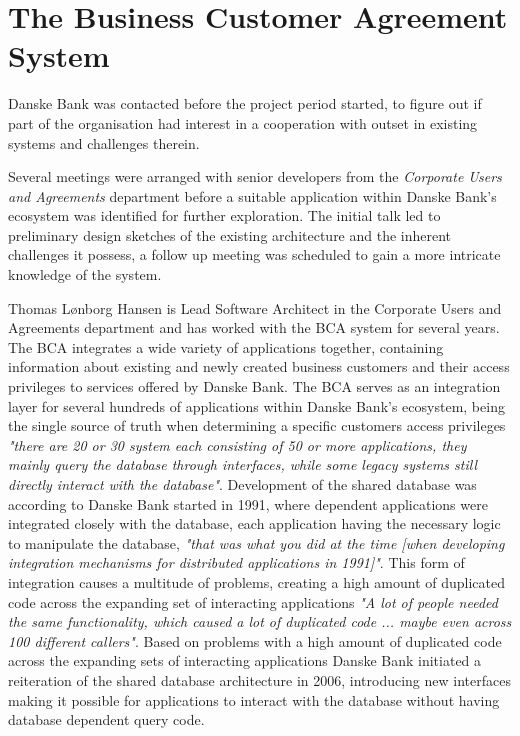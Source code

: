 \section{The Business Customer Agreement System}
Danske Bank was contacted before the project period started, to figure out if part of the organisation had interest in a cooperation with outset in existing systems and challenges therein. 

Several meetings were arranged with senior developers from the \textit{Corporate Users and Agreements} department before a suitable application within Danske Bank's ecosystem was identified for further exploration. The initial talk led to preliminary design sketches of the existing architecture and the inherent challenges it possess, a follow up meeting was scheduled to gain a more intricate knowledge of the system.

Thomas Lønborg Hansen is Lead Software Architect in the Corporate Users and Agreements department and has worked with the BCA system for several years. The BCA integrates a wide variety of applications together, containing information about existing and newly created business customers and their access privileges to services offered by Danske Bank. The BCA serves as an integration layer for several hundreds of applications within Danske Bank's ecosystem, being the single source of truth when determining a specific customers access privileges \textit{"there are 20 or 30 system each consisting of 50 or more applications, they mainly query the database through interfaces, while some legacy systems still directly interact with the database"}. Development of the shared database was according to Danske Bank started in 1991, where dependent applications were integrated closely with the database, each application having the necessary logic to manipulate the database, \textit{"that was what you did at the time [when developing integration mechanisms for distributed applications in 1991]"}. This form of integration causes a multitude of problems, creating a high amount of duplicated code across the expanding set of interacting applications \textit{"A lot of people needed the same functionality, which caused a lot of duplicated code ... maybe even across 100 different callers"}. Based on problems with a high amount of duplicated code across the expanding sets of interacting applications Danske Bank initiated a reiteration of the shared database architecture in 2006, introducing new interfaces making it possible for applications to interact with the database without having database dependent query code.

